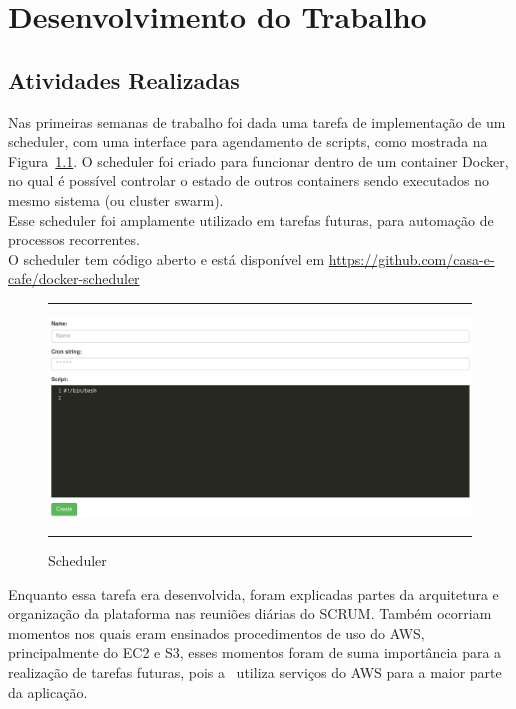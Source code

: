\chapter{Desenvolvimento do Trabalho}\label{chap:atividadesRealizadas}


\section{Atividades Realizadas}

Nas primeiras semanas de trabalho foi dada uma tarefa de implementação de um \gls{scheduler}, com uma interface para agendamento de scripts, como mostrada na Figura~\ref{fig:scheduler}. O \gls{scheduler} foi criado para funcionar dentro de um \gls{container} \gls{Docker}, no qual é possível controlar o estado de outros \glspl{container} sendo executados no mesmo sistema (ou \gls{cluster swarm}).\\

Esse \gls{scheduler} foi amplamente utilizado em tarefas futuras, para automação de processos recorrentes.\\

O \gls{scheduler} tem código aberto e está disponível em \url{https://github.com/casa-e-cafe/docker-scheduler}\\

\begin{figure}[h]
  \rule[1ex]{\textwidth}{0.25pt}
  \centering\includegraphics[width=1.00\textwidth]{img/scheduler.png}
  \caption[Scheduler]
  {Scheduler}\label{fig:scheduler}
  \rule[1ex]{\textwidth}{0.25pt}
\end{figure}

Enquanto essa tarefa era desenvolvida, foram explicadas partes da arquitetura e organização da plataforma nas reuniões diárias do \gls{SCRUM}. Também ocorriam momentos nos quais eram ensinados procedimentos de uso do \gls{AWS}, principalmente do \gls{EC2} e \gls{S3}, esses momentos foram de suma importância para a realização de tarefas futuras, pois a \nomeEmpresa~utiliza serviços do \gls{AWS} para a maior parte da aplicação.\\

